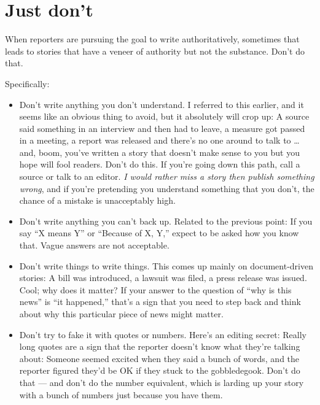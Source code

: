 \documentclass[
  11pt,
  american,
  letterpaperpaper,
  extrafontsizes,onecolumn,openright
  ]{memoir}
\providecommand{\tightlist}{%
  \setlength{\itemsep}{0pt}\setlength{\parskip}{0pt}}
\begin{document}
\hypertarget{just-dont}{%
\section*{Just don't}\label{just-dont}}

When reporters are pursuing the goal to write authoritatively, sometimes that leads to stories that have a veneer of authority but not the substance. Don't do that.

Specifically:

\begin{itemize}
\tightlist
\item
  Don't write anything you don't understand. I referred to this earlier, and it seems like an obvious thing to avoid, but it absolutely will crop up: A source said something in an interview and then had to leave, a measure got passed in a meeting, a report was released and there's no one around to talk to \ldots{} and, boom, you've written a story that doesn't make sense to you but you hope will fool readers. Don't do this. If you're going down this path, call a source or talk to an editor. \emph{I would rather miss a story then publish something wrong}, and if you're pretending you understand something that you don't, the chance of a mistake is unacceptably high.
\item
  Don't write anything you can't back up. Related to the previous point: If you say \enquote{X means Y} or \enquote{Because of X, Y,} expect to be asked how you know that. Vague answers are not acceptable.
\item
  Don't write things to write things. This comes up mainly on document-driven stories: A bill was introduced, a lawsuit was filed, a press release was issued. Cool; why does it matter? If your answer to the question of \enquote{why is this news} is \enquote{it happened,} that's a sign that you need to step back and think about why this particular piece of news might matter.
\item
  Don't try to fake it with quotes or numbers. Here's an editing secret: Really long quotes are a sign that the reporter doesn't know what they're talking about: Someone seemed excited when they said a bunch of words, and the reporter figured they'd be OK if they stuck to the gobbledegook. Don't do that --- and don't do the number equivalent, which is larding up your story with a bunch of numbers just because you have them.
\end{itemize}
\end{document}
